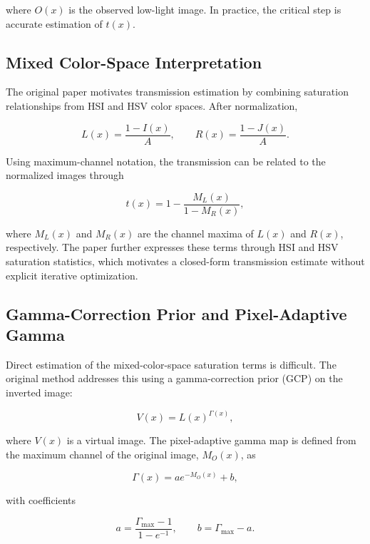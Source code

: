 \documentclass[conference]{IEEEtran}
\begin{document}
where $O(x)$ is the observed low-light image. In practice, the critical step is accurate estimation of $t(x)$.

\subsection{Mixed Color-Space Interpretation}
The original paper motivates transmission estimation by combining saturation relationships from HSI and HSV color spaces. After normalization,

\begin{equation}
L(x) = \frac{1 - I(x)}{A}, \qquad R(x) = \frac{1 - J(x)}{A}.
\label{eq:normalized_lr}
\end{equation}

Using maximum-channel notation, the transmission can be related to the normalized images through

\begin{equation}
t(x) = 1 - \frac{M_L(x)}{1 - M_R(x)},
\label{eq:max_channel_t}
\end{equation}

where $M_L(x)$ and $M_R(x)$ are the channel maxima of $L(x)$ and $R(x)$, respectively. The paper further expresses these terms through HSI and HSV saturation statistics, which motivates a closed-form transmission estimate without explicit iterative optimization.

\subsection{Gamma-Correction Prior and Pixel-Adaptive Gamma}
Direct estimation of the mixed-color-space saturation terms is difficult. The original method addresses this using a gamma-correction prior (GCP) on the inverted image:

\begin{equation}
V(x) = L(x)^{\Gamma(x)},
\label{eq:gcp}
\end{equation}

where $V(x)$ is a virtual image. The pixel-adaptive gamma map is defined from the maximum channel of the original image, $M_O(x)$, as

\begin{equation}
\Gamma(x) = a e^{-M_O(x)} + b,
\label{eq:adaptive_gamma}
\end{equation}

with coefficients

\begin{equation}
a = \frac{\Gamma_{\max} - 1}{1 - e^{-1}}, \qquad b = \Gamma_{\max} - a.
\label{eq:gamma_coeffs}
\end{equation}
\end{document}
